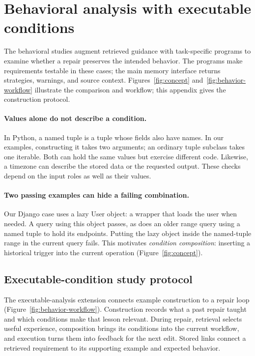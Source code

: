\section{Behavioral analysis with executable conditions}
\label{sec:executable-analysis}
The behavioral studies augment retrieved guidance with task-specific
programs to examine whether a repair preserves the intended behavior.
The programs make requirements testable in these cases; the main memory
interface returns strategies, warnings, and source context.
Figures~\ref{fig:concept} and~\ref{fig:behavior-workflow} illustrate the
comparison and workflow; this appendix gives the construction protocol.
\paragraph{Values alone do not describe a condition.}
In Python, a named tuple is a tuple whose fields also have names. In our
examples, constructing it takes two arguments; an ordinary tuple subclass
takes one iterable. Both can hold the same values but exercise
different code. Likewise, a timezone can describe the stored data or the
requested output. These checks depend on the input roles as well as their values.

\paragraph{Two passing examples can hide a failing combination.}
Our Django case uses a lazy User object: a wrapper that loads the user when
needed. A query using this object passes, as does an older range query using
a named tuple to hold its endpoints. Putting the lazy object inside the
named-tuple range in the current query fails. This motivates
\emph{condition composition}: inserting a historical trigger into the current operation
(Figure~\ref{fig:concept}).

\subsection{Executable-condition study protocol}
\label{sec:executable-protocol}
The executable-analysis extension connects example construction to a repair loop
(Figure~\ref{fig:behavior-workflow}). Construction records what a past repair taught
and which conditions make that lesson relevant. During repair, retrieval
selects useful experience, composition brings its conditions into the
current workflow, and execution turns them into feedback for the next edit.
Stored links connect a retrieved requirement to its supporting example and
expected behavior.


